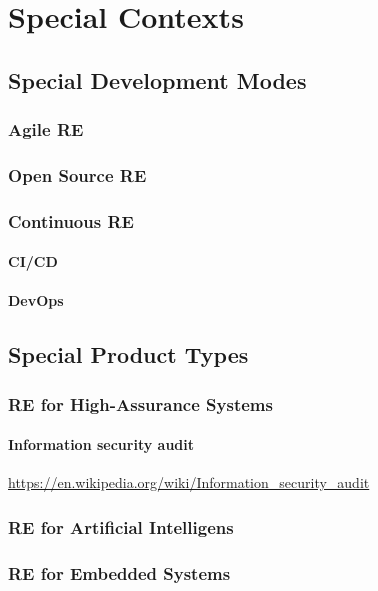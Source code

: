 \documentclass{reqengbook}
\begin{document}
\part{Special Contexts}

\chapter{Special Development Modes}

\section{Agile RE}

\section{Open Source RE}

\section{Continuous RE}

\subsection{CI/CD}
\subsection{DevOps}

\chapter{Special Product Types}

\section{RE for High-Assurance Systems}
\subsection{Information security audit}
\url{https://en.wikipedia.org/wiki/Information_security_audit}

\section{RE for Artificial Intelligens}

\section{RE for Embedded Systems}
\end{document}
